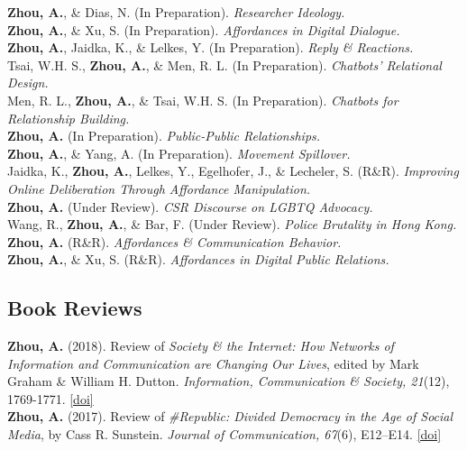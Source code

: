\documentclass[12pt, letterpaper]{article}
\newcommand{\doi}[1]{\href{#1}{{[doi]}}}
\newcommand{\years}[1]{\marginnote{\normalsize #1}}
\begin{document}
{\years{[12]} \textbf{Zhou, A.}, \& Dias, N. (In Preparation). \textit{Researcher Ideology.}\\
\years{[11]} \textbf{Zhou, A.}, \& Xu, S. (In Preparation). \textit{Affordances in Digital Dialogue.}\\
\years{[10]} \textbf{Zhou, A.}, Jaidka, K., \& Lelkes, Y. (In Preparation). \textit{Reply \& Reactions.}\\
\years{[9]} Tsai, W.H. S., \textbf{Zhou, A.}, \&  Men, R. L. (In Preparation). \textit{Chatbots' Relational Design.}\\
\years{[8]} Men, R. L., \textbf{Zhou, A.}, \& Tsai, W.H. S. (In Preparation). \textit{Chatbots for Relationship Building.}\\
\years{[7]} \textbf{Zhou, A.} (In Preparation). \textit{Public-Public Relationships.}\\
\years{[6]} \textbf{Zhou, A.}, \& Yang, A. (In Preparation). \textit{Movement Spillover.}\\
\years{[5]} Jaidka, K., \textbf{Zhou, A.}, Lelkes, Y., Egelhofer, J., \& Lecheler, S. (R\&R). \textit{Improving Online Deliberation Through Affordance Manipulation.}\\
\years{[4]} \textbf{Zhou, A.} (Under Review). \textit{CSR Discourse on LGBTQ Advocacy.}\\
\years{[3]} Wang, R., \textbf{Zhou, A.}, \& Bar, F. (Under Review). \textit{Police Brutality in Hong Kong.}\\
\years{[2]} \textbf{Zhou, A.} (R\&R). \textit{Affordances \& Communication Behavior.}\\
\years{[1]} \textbf{Zhou, A.}, \& Xu, S. (R\&R). \textit{Affordances in Digital Public Relations.}

\subsection*{Book Reviews}

  \years{[2]} \textbf{Zhou, A.} (2018). Review of \textit{Society \& the Internet: How Networks of Information and Communication are Changing Our Lives}, edited by Mark Graham \& William H. Dutton. \textit{Information, Communication \& Society, 21}(12), 1769-1771. \doi{https://doi.org/10.1080/1369118X.2018.1465577}\\
  \years{[1]} \textbf{Zhou, A.} (2017). Review of \textit{\#Republic: Divided Democracy in the Age of Social Media}, by Cass R. Sunstein. \textit{Journal of Communication, 67}(6), E12–E14. \doi{https://doi.org/10.1111/jcom.12344}

}
\end{document}

